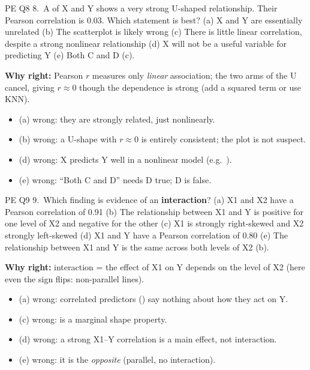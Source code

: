 \begin{qbox}{PE Q8}
8.~A  of X and Y shows a very strong U-shaped relationship. Their Pearson correlation is 0.03. Which statement is best?
(a) X and Y are essentially unrelated \quad (b) The scatterplot is likely wrong \quad (c) There is little linear correlation, despite a strong nonlinear relationship \quad (d) X will not be a useful variable for predicting Y \quad (e) Both C and D
\ans (c).\par
\textbf{Why right:} Pearson $r$ measures only \emph{linear} association; the two arms of the U cancel, giving $r\approx0$ though the dependence is strong (add a squared term or use KNN).
\begin{itemize}[leftmargin=1em,itemsep=0pt]
\item (a) wrong: they are strongly related, just nonlinearly.
\item (b) wrong: a U-shape with $r\approx0$ is entirely consistent; the plot is not suspect.
\item (d) wrong: X predicts Y well in a nonlinear model (e.g.\ ).
\item (e) wrong: ``Both C and D'' needs D true; D is false.
\end{itemize}
\end{qbox}

\begin{qbox}{PE Q9}
9.~Which  finding is evidence of an \textbf{interaction}?
(a) X1 and X2 have a Pearson correlation of 0.91 \quad (b) The relationship between X1 and Y is positive for one level of X2 and negative for the other \quad (c) X1 is strongly right-skewed and X2 strongly left-skewed \quad (d) X1 and Y have a Pearson correlation of 0.80 \quad (e) The relationship between X1 and Y is the same across both levels of X2
\ans (b).\par
\textbf{Why right:} interaction = the effect of X1 on Y depends on the level of X2 (here even the sign flips: non-parallel lines).
\begin{itemize}[leftmargin=1em,itemsep=0pt]
\item (a) wrong: correlated predictors () say nothing about how they act on Y.
\item (c) wrong:  is a marginal shape property.
\item (d) wrong: a strong X1--Y correlation is a main effect, not interaction.
\item (e) wrong: it is the \emph{opposite} (parallel, no interaction).
\end{itemize}
\end{qbox}

